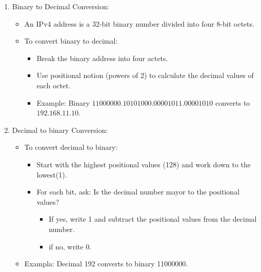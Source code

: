 \documentclass[a4paper,11pt]{article}
\begin{document}
\begin{enumerate}
    \item Binary to Decimal Conversion:\\
    \begin{itemize}
        \item An IPv4 address is a 32-bit binary number divided into four 8-bit octets.\\
        \item To convert binary to decimal:\\
        \begin{itemize}
            \item Break the binary address into four actets.\\
            \item Use positional notion (powers of 2) to calculate the decimal values of each octet.\\
            \item Example: Binary $11000000.10101000.00001011.00001010$ converts to $192.168.11.10$.\\
        \end{itemize}
    \end{itemize}
    \item Decimal to binary Conversion:\\
    \begin{itemize}
        \item To convert decimal to binary:\\
        \begin{itemize}
            \item Start with the highest positional values (128) and work down to the lowest(1).
            \item For each bit, ask: Is the decimal number mayor to the positional values?\\
            \begin{itemize}
                \item If yes, write 1 and subtract the positional values from the decimal number.\\
                \item if no, write 0.\\
            \end{itemize}
        \end{itemize}
        \item Exampla: Decimal 192 converts to binary 11000000.\\
    \end{itemize}
\end{enumerate}
\end{document}
